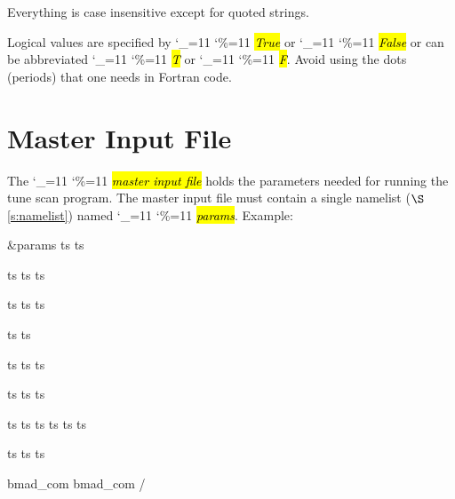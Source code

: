 \documentclass{hitec}
\newcommand\dottcmd[1]{\hl{\em#1}\endgroup}
\newcommand{\vn}{\begingroup\catcode`\_=11 \catcode`\%=11 \dottcmd}
\newcommand{\sref}[1]{$\S$\ref{#1}}
\newcommand{\Section}[1]{\section{#1}\vspace*{-1ex}}
\begin{document}
Everything is case insensitive except for quoted strings.

Logical values are specified by \vn{True} or \vn{False} or can be
abbreviated \vn{T} or \vn{F}. Avoid using the dots (periods) that one
needs in Fortran code.

\Section{Master Input File}
\label{s:input}

The \vn{master input file} holds the parameters needed for running the tune scan program. The master
input file must contain a single namelist (\sref{s:namelist}) named \vn{params}.  Example:
\begin{code}
&params
  ts%
  ts%

  ts%
  ts%
  ts%

  ts%
  ts%
  ts%

  ts%
  ts%

  ts%
  ts%
  ts%

  ts%
  ts%
  ts%

  ts%
  ts%
  ts%
  ts%
  ts%
  ts%

  ts%
  ts%
  ts%

  bmad_com%
  bmad_com%
/
\end{code}
\end{document}
